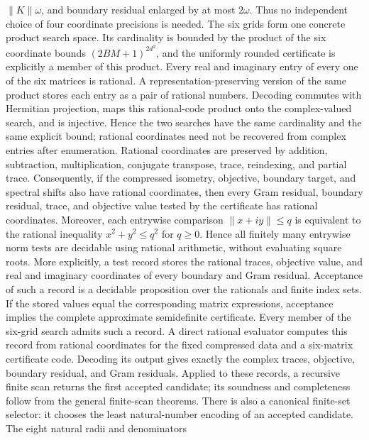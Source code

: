 \begin{lemma}
    $\lVert K\rVert\omega$, and boundary residual enlarged by at most
    $2\omega$.  Thus no independent choice of four coordinate precisions is
    needed.  The six grids form one concrete product search space.  Its
    cardinality is bounded by the product of the six coordinate bounds
    $(2BM+1)^{2d^2}$, and the uniformly rounded certificate is explicitly a
    member of this product.  Every real and imaginary entry of every one of
    the six matrices is rational.  A representation-preserving version of
    the same product stores each entry as a pair of rational numbers.
    Decoding commutes with Hermitian projection, maps this rational-code
    product onto the complex-valued search, and is injective.  Hence the two
    searches have the same cardinality and the same explicit bound; rational
    coordinates need not be recovered from complex entries after enumeration.
    Rational coordinates are preserved by
    addition, subtraction, multiplication, conjugate transpose, trace,
    reindexing, and partial trace.  Consequently, if the compressed isometry,
    objective, boundary target, and spectral shifts also have rational
    coordinates, then every Gram residual, boundary residual, trace, and
    objective value tested by the certificate has rational coordinates.
    Moreover, each entrywise comparison
    $\lVert x+iy\rVert\le q$ is equivalent to the rational inequality
    $x^2+y^2\le q^2$ for $q\ge0$.  Hence all finitely many entrywise norm
    tests are decidable using rational arithmetic, without evaluating square
    roots.  More explicitly, a test record stores the rational traces,
    objective value, and real and imaginary coordinates of every boundary and
    Gram residual.  Acceptance of such a record is a decidable proposition
    over the rationals and finite index sets.  If the stored values equal the
    corresponding matrix expressions, acceptance implies the complete
    approximate semidefinite certificate.  Every member of the six-grid search
    admits such a record.  A direct rational evaluator computes this record
    from rational coordinates for the fixed compressed data and a six-matrix
    certificate code.  Decoding its output gives exactly the complex traces,
    objective, boundary residual, and Gram residuals.  Applied to these records,
    a recursive finite scan returns the first accepted candidate; its soundness
    and completeness follow from the general finite-scan theorems.  There is
    also a canonical finite-set selector: it chooses the least natural-number
    encoding of an accepted candidate.  The eight natural radii and denominators

\end{lemma}
